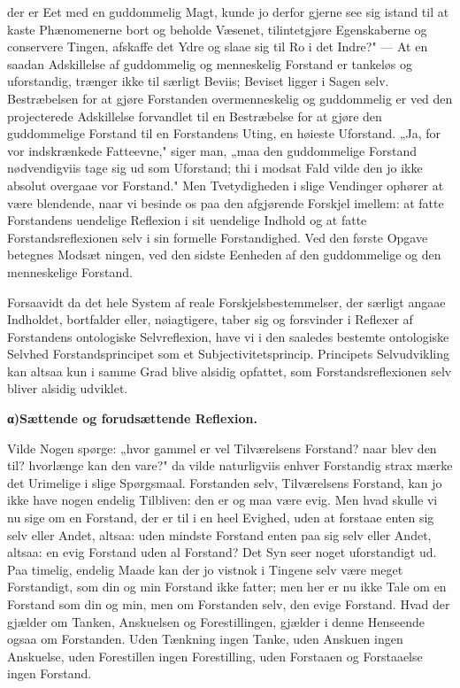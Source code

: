 \documentclass[12pt]{book}
\newcommand{\opage}[1]{\marginnote{\footnotesize\textit{[#1]}}}
\begin{document}
der er Eet med en guddommelig Magt, kunde jo derfor gjerne see sig istand til at
kaste Phænomenerne bort og beholde Væsenet, tilintetgjøre Egenskaberne og
conservere Tingen, afskaffe det Ydre og slaae sig til Ro i det Indre?" --- At en
saadan Adskillelse af guddommelig og menneskelig Forstand er tankeløs og
uforstandig, trænger ikke til særligt Beviis; Beviset ligger i Sagen selv.
Bestræbelsen for at gjøre Forstanden overmenneskelig og guddommelig er ved den
projecterede Adskillelse forvandlet til en Bestræbelse for at gjøre den
guddommelige Forstand til en Forstandens Uting, en høieste Uforstand. „Ja, for vor
indskrænkede Fatteevne," siger man, „maa den guddommelige Forstand nødvendigviis
tage sig ud som Uforstand; thi i modsat Fald vilde den jo ikke absolut overgaae
vor Forstand." Men Tvetydigheden i slige Vendinger ophører at være blendende, naar
vi besinde os paa den afgjørende Forskjel imellem: at fatte Forstandens uendelige
Reflexion i sit uendelige Indhold og at fatte Forstandsreflexionen selv i sin
formelle Forstandighed. Ved den første Opgave betegnes Modsæt%
\opage{62} ningen, ved den sidste Eenheden af den guddommelige og den menneskelige Forstand.

Forsaavidt da det hele System af reale Forskjelsbestemmelser, der særligt angaae
Indholdet, bortfalder eller, nøiagtigere, taber sig og forsvinder i Reflexer af
Forstandens ontologiske Selvreflexion, have vi i den saaledes bestemte ontologiske
Selvhed Forstandsprincipet som et Subjectivitetsprincip. Principets Selvudvikling
kan altsaa kun i samme Grad blive alsidig opfattet, som Forstandsreflexionen selv
bliver alsidig udviklet.

\begin{center}
{\bfseries α)\quad Sættende og forudsættende Reflexion.}
\end{center}

Vilde Nogen spørge: „hvor gammel er vel Tilværelsens Forstand? naar blev den til?
hvorlænge kan den vare?" da vilde naturligviis enhver Forstandig strax mærke det
Urimelige i slige Spørgsmaal. Forstanden selv, Tilværelsens Forstand, kan jo ikke
have nogen endelig Tilbliven: den er og maa være evig. Men hvad skulle vi nu sige
om en Forstand, der er til i en heel Evighed, uden at forstaae enten sig selv eller
Andet, altsaa: uden mindste Forstand enten paa sig selv eller Andet, altsaa: en
evig Forstand uden al Forstand? Det Syn seer noget uforstandigt ud. Paa timelig,
endelig Maade kan der jo vistnok i Tingene selv være meget Forstandigt, som din og
min Forstand ikke fatter; men her er nu ikke Tale om en Forstand som din og min,
men om Forstanden selv, den evige Forstand. Hvad der gjælder om Tanken, Anskuelsen
og Forestillingen, gjælder i denne Henseende ogsaa om Forstanden. Uden Tænkning
ingen Tanke, uden Anskuen ingen Anskuelse, uden Forestillen ingen Forestilling,
uden Forstaaen og Forstaaelse ingen Forstand.
\end{document}
